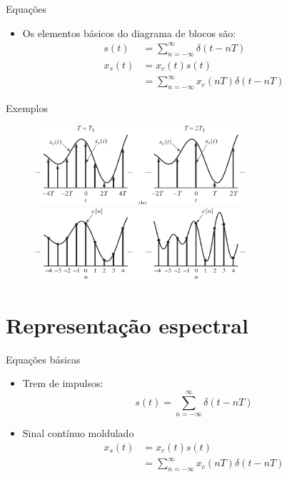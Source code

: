 \documentclass[
size=11pt,
paper=screen,
mode=present,
display=slidesnotes,
style=paintings,
nopagebreaks,
blackslide,
fleqn]{powerdot}
\begin{document}
\begin{slide}{Equações}
\begin{itemize}
   \item Os elementos básicos do diagrama de blocos são:
   \begin{align}
      s(t) &= \sum_{n=-\infty}^{\infty}\delta(t-nT)\\
      x_s(t) &= x_c(t)s(t) \\ &= \sum_{n=-\infty}^{\infty}x_c(nT)\delta(t-nT)
   \end{align}
\end{itemize}
\end{slide}

\begin{slide}{Exemplos}
   \begin{figure}
      \centering
      \includegraphics[width=0.7\textwidth]{figs/representacao1.eps}
      \includegraphics[width=0.7\textwidth]{figs/representacao2.eps}
   \end{figure}
\end{slide}

\section{Representação espectral}
\begin{slide}{Equações básicas}
\begin{itemize}
   \item Trem de impulsos:
   \begin{equation}
      s(t) = \sum_{n=-\infty}^{\infty}\delta(t-nT)
   \end{equation}
   \item Sinal cont\'inuo moldulado
   \begin{align}
      x_s(t) &= x_c(t)s(t)\\
             &= \sum_{n=-\infty}^{\infty}x_c(nT)\delta(t-nT)
   \end{align}
\end{itemize}
\end{slide}
\end{document}
